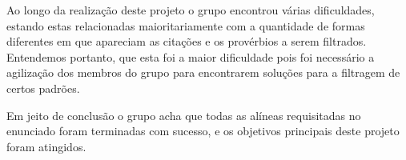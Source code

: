 \documentclass[11pt,a4paper]{report}
\begin{document}
Ao longo da realização deste projeto o grupo encontrou várias dificuldades, estando estas relacionadas maioritariamente com a quantidade de formas diferentes em que apareciam as citações e os provérbios a serem filtrados. Entendemos portanto, que esta foi a maior dificuldade pois foi necessário a agilização dos membros do grupo para encontrarem soluções para a filtragem de certos padrões.

Em jeito de conclusão o grupo acha que todas as alíneas requisitadas no enunciado foram terminadas com sucesso, e os objetivos principais deste projeto foram atingidos.
\end{document}
